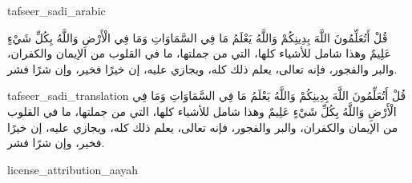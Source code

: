 \begin{taggedblock}{tafseer_sadi_arabic}
\begin{Arabic}
{ قُلْ أَتُعَلِّمُونَ اللَّهَ بِدِينِكُمْ وَاللَّهُ يَعْلَمُ مَا فِي السَّمَاوَاتِ وَمَا فِي الْأَرْضِ وَاللَّهُ بِكُلِّ شَيْءٍ عَلِيمٌ }
وهذا شامل للأشياء كلها، التي من جملتها، ما في القلوب من الإيمان والكفران، والبر والفجور، فإنه تعالى، يعلم ذلك كله، ويجازي عليه، إن خيرًا فخير، وإن شرًا فشر.
\end{Arabic}
\end{taggedblock}
\begin{taggedblock}{tafseer_sadi_translation}
{ قُلْ أَتُعَلِّمُونَ اللَّهَ بِدِينِكُمْ وَاللَّهُ يَعْلَمُ مَا فِي السَّمَاوَاتِ وَمَا فِي الْأَرْضِ وَاللَّهُ بِكُلِّ شَيْءٍ عَلِيمٌ }
وهذا شامل للأشياء كلها، التي من جملتها، ما في القلوب من الإيمان والكفران، والبر والفجور، فإنه تعالى، يعلم ذلك كله، ويجازي عليه، إن خيرًا فخير، وإن شرًا فشر.
\end{taggedblock}
\begin{taggedblock}{license_attribution_aayah}

\end{taggedblock}
\begin{comment}
Please use the following for footnotes:- Sample\footnoteQ{Text of Qur'an footnote goes here.}.
Sample\footnoteT{Text of Tafseer footnote goes here.}.
\end{comment}